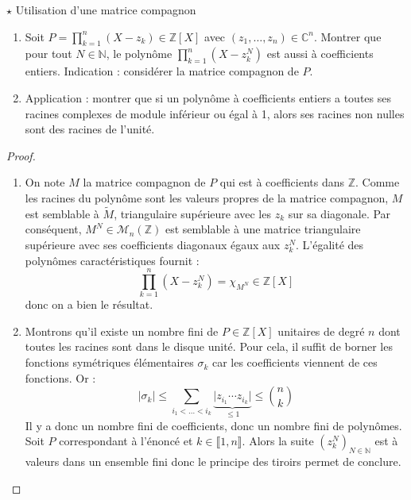 \documentclass[french,a4paper]{article}
\newcommand{\N}{\mathbb{N}}
\newcommand{\Z}{\mathbb{Z}}
\newcommand{\C}{\mathbb{C}}
\theoremstyle{plain}
\theoremstyle{definition}
\theoremstyle{remark}
\begin{document}
\begin{ex}{$\star$ Utilisation d'une matrice compagnon}
	\begin{enumerate}
		\item Soit $\displaystyle P=\prod_{k=1}^{n}(X-z_k)\in\Z[X]$ avec $(z_1,\ldots,z_n)\in\C^n$. Montrer que pour tout $N\in\N$, le polynôme $\displaystyle\prod_{k=1}^{n}(X-z_k^N)$ est aussi à coefficients entiers. Indication : considérer la matrice compagnon de $P$.
		\item Application : montrer que si un polynôme à coefficients entiers a toutes ses racines complexes de module inférieur ou égal à 1, alors ses racines non nulles sont des racines de l'unité.
	\end{enumerate}
\end{ex}
\begin{proof}
	\begin{enumerate}
		\item On note $M$ la matrice compagnon de $P$ qui est à coefficients dans $\Z$. Comme les racines du polynôme sont les valeurs propres de la matrice compagnon, $M$ est semblable à $\tilde{M}$, triangulaire supérieure avec les $z_k$ sur sa diagonale. Par conséquent, $M^N\in\mathcal{M}_n(\Z)$ est semblable à une matrice triangulaire supérieure avec ses coefficients diagonaux égaux aux $z_k^N$. L'égalité des polynômes caractéristiques fournit : $$\prod_{k=1}^{n}(X-z_k^N)=\chi_{M^N}\in\Z[X]$$ donc on a bien le résultat.
		\item Montrons qu'il existe un nombre fini de $P\in\Z[X]$ unitaires de degré $n$ dont toutes les racines sont dans le disque unité. Pour cela, il suffit de borner les fonctions symétriques élémentaires $\sigma_k$ car les coefficients viennent de ces fonctions. Or : $$\lvert\sigma_k\rvert\leqslant\sum_{i_1<\ldots<i_k}\underbrace{\lvert z_{i_1}\cdots z_{i_k}\rvert}_{\leqslant 1}\leqslant\binom{n}{k}$$ Il y a donc un nombre fini de coefficients, donc un nombre fini de polynômes. Soit $P$ correspondant à l'énoncé et $k\in\llbracket1,n\rrbracket$. Alors la suite $(z_k^N)_{N\in\N}$ est à valeurs dans un ensemble fini donc le principe des tiroirs permet de conclure.
	\end{enumerate}
\end{proof}
\end{document}
